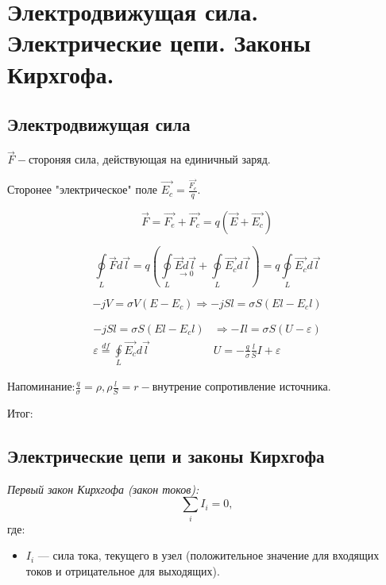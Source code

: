 \section{Электродвижущая сила. Электрические цепи. Законы Кирхгофа.}
 
\subsection*{Электродвижущая сила}


$\vec{F}-$стороняя сила, действующая на единичный заряд.

Сторонее "электрическое" поле $\vec{E_c}= \frac{\vec{F_c}}{q}.$

\[\vec{F}=\vec{F_e}+\vec{F_c}=q(\vec{E}+\vec{E_c})\]

\[\underset{L}{\oint}\vec{F}d\vec{l}=q\left( \underset{L}{\oint} \underset{\rightarrow 0}{\vec{E}d\vec{l}} + \underset{L}{\oint} \vec{E_c}d\vec{l} \right)=q\underset{L}{\oint} \vec{E_c}d\vec{l}\]

\[-jV=\sigma V(E-E_c)\Rightarrow-jSl=\sigma S(El-E_cl)\]

\[
\begin{array}{l|l}
    -jSl=\sigma S(El-E_cl) & \Rightarrow -Il=\sigma S(U-\varepsilon)\\
    \varepsilon\overset{df}{=}\underset{L}{\oint} \vec{E_c}d\vec{l} & U=-\frac{q}{\sigma}\frac{l}{S}I+\varepsilon     
\end{array}
\]

Напоминание:$\frac{q}{\sigma}=\rho, \rho\frac{l}{S}=r-$внутрение сопротивление источника.

\begin{center}
    Итог:
\end{center}

\newpage

\subsection*{Электрические цепи и законы Кирхгофа}

\textit{Первый закон Кирхгофа (закон токов):}
\[
\sum_{i} I_i = 0,
\]
где:  
\begin{itemize}
    \item \( I_i \) — сила тока, текущего в узел (положительное значение для входящих токов и отрицательное для выходящих).
\end{itemize}

